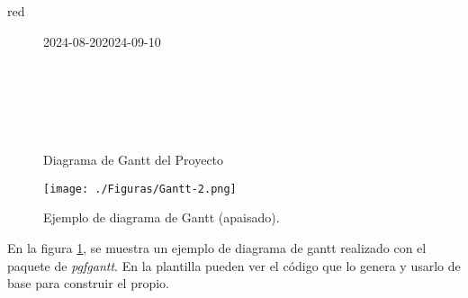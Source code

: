 \begin{consigna}{red}
	\begin{landscape}
		\begin{figure}[htpb]
			\begin{center}
				\begin{ganttchart}[
						time slot unit=day,
						time slot format=isodate,
						x unit=0.3cm, %
						y unit title=0.9cm, %
						y unit chart=0.8cm, %
						milestone/.append style={xscale=4},
						vgrid,
						hgrid,
						compress calendar %
					]{2024-08-20}{2024-09-10}
					 \\
					 \\
					 \\ %
	
					 \\
					 \\
					 \\
	
				\end{ganttchart}
			\end{center}
			\caption{Diagrama de Gantt del Proyecto}
			\label{fig:gantt}
		\end{figure}
	\end{landscape}

	\begin{landscape}
		\begin{figure}[htpb]
			\centering
			\texttt{[image: ./Figuras/Gantt-2.png]}
			\caption{Ejemplo de diagrama de Gantt (apaisado).} %
			\label{fig:diagGantt}
		\end{figure}

	\end{landscape}

\end{consigna}

En la figura \ref{fig:gantt}, se muestra un ejemplo de diagrama de gantt
realizado con el paquete de \textit{pgfgantt}. En la plantilla pueden ver el
código que lo genera y usarlo de base para construir el propio.

